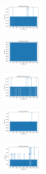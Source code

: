 \begin{figure}[H]
\begin{subfigure}
    \end{subfigure}
    \hfill
    \begin{subfigure}
        \centering
        \includegraphics[width=0.234\textwidth]{img/agesf/ecoli_set_const_20_589741062_time.png}
    \end{subfigure}
    \hfill
    \begin{subfigure}
        \centering
        \includegraphics[width=0.234\textwidth]{img/agesf/rand_set_const_20_589741062_time.png}
    \end{subfigure}
    \hfill
    \begin{subfigure}
        \centering
        \includegraphics[width=0.234\textwidth]{img/agesf/newthyroid_set_const_20_589741062_time.png}
    \end{subfigure}
    \hfill
    \begin{subfigure}
        \centering
        \includegraphics[width=0.234\textwidth]{img/agesf/iris_set_const_20_277451237_time.png}
    \end{subfigure}
    \hfill
    \begin{subfigure}
        \centering
        \includegraphics[width=0.234\textwidth]{img/agesf/ecoli_set_const_20_277451237_time.png}
    \end{subfigure}
    \hfill

\end{figure}
